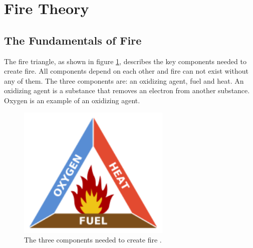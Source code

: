 \section{Fire Theory}
\subsection{The Fundamentals of Fire}
The fire triangle, as shown in figure \ref{fig:fire-triangle}, describes the key components needed to create fire. All components depend on each other and fire can not exist without any of them. The three components are: an oxidizing agent, fuel and heat. An oxidizing agent is a substance that removes an electron from another substance. Oxygen is an example of an oxidizing agent.

\begin{figure}[here]
  \centering
      \includegraphics[width=0.65\textwidth]{theory/graphics/fire-triangle.png}
  \caption{ The three components needed to create fire \cite{fire-tirangleimage}. }
  \label{fig:fire-triangle}
\end{figure}

